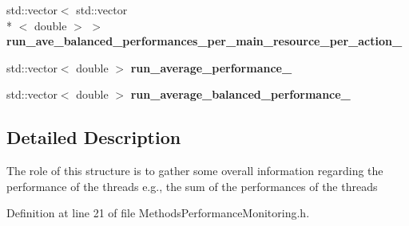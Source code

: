 \begin{DoxyCompactItemize}
\item 
\hypertarget{structStruct__OverallPerformance_af286bc0a54cf35dc819b8b36b4e2f11e}{std\-::vector$<$ std\-::vector\\*
$<$ double $>$ $>$ {\bfseries run\-\_\-ave\-\_\-balanced\-\_\-performances\-\_\-per\-\_\-main\-\_\-resource\-\_\-per\-\_\-action\-\_\-}}\label{structStruct__OverallPerformance_af286bc0a54cf35dc819b8b36b4e2f11e}

\item 
\hypertarget{structStruct__OverallPerformance_a2a228d31c1f56c628e7a597d8c3782b4}{std\-::vector$<$ double $>$ {\bfseries run\-\_\-average\-\_\-performance\-\_\-}}\label{structStruct__OverallPerformance_a2a228d31c1f56c628e7a597d8c3782b4}

\item 
\hypertarget{structStruct__OverallPerformance_a79de6182a1fead9069b00a1db4a87b9a}{std\-::vector$<$ double $>$ {\bfseries run\-\_\-average\-\_\-balanced\-\_\-performance\-\_\-}}\label{structStruct__OverallPerformance_a79de6182a1fead9069b00a1db4a87b9a}

\end{DoxyCompactItemize}


\subsection{Detailed Description}
The role of this structure is to gather some overall information regarding the performance of the threads e.\-g., the sum of the performances of the threads 

Definition at line 21 of file Methods\-Performance\-Monitoring.\-h.



